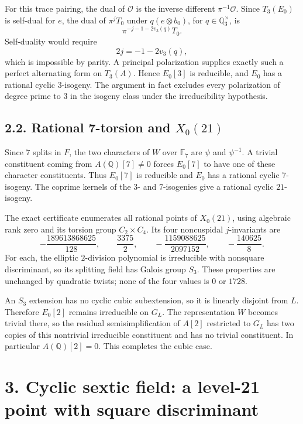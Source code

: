 \documentclass[
  11pt,
]{article}
\newcounter{none} %
\begin{document}
For this trace pairing, the dual of \(\mathcal O\) is the inverse
different \(\pi^{-1}\mathcal O\). Since \(T_3(E_0)\) is self-dual for
\(e\), the dual of \(\pi^jT_0\) under \(q(e\otimes b_0)\), for
\(q\in\mathbb Q_3^\times\), is \[
\pi^{-j-1-2v_3(q)}T_0.
\] Self-duality would require \[
2j=-1-2v_3(q),
\] which is impossible by parity. A principal polarization supplies
exactly such a perfect alternating form on \(T_3(A)\). Hence \(E_0[3]\)
is reducible, and \(E_0\) has a rational cyclic \(3\)-isogeny. The
argument in fact excludes every polarization of degree prime to \(3\) in
the isogeny class under the irreducibility hypothesis.

\subsection{\texorpdfstring{2.2. Rational 7-torsion and
\(X_0(21)\)}{2.2. Rational 7-torsion and X\_0(21)}}\label{rational-7-torsion-and-x_021}

Since \(7\) splits in \(F\), the two characters of \(W\) over
\(\mathbb F_7\) are \(\psi\) and \(\psi^{-1}\). A trivial constituent
coming from \(A(\mathbb Q)[7]\ne0\) forces \(E_0[7]\) to have one of
these character constituents. Thus \(E_0[7]\) is reducible and \(E_0\)
has a rational cyclic \(7\)-isogeny. The coprime kernels of the \(3\)-
and \(7\)-isogenies give a rational cyclic \(21\)-isogeny.

The exact certificate enumerates all rational points of \(X_0(21)\),
using algebraic rank zero and its torsion group \(C_2\times C_4\). Its
four noncuspidal \(j\)-invariants are \[
-\frac{189613868625}{128},\qquad \frac{3375}{2},\qquad
-\frac{1159088625}{2097152},\qquad -\frac{140625}{8}.
\] For each, the elliptic \(2\)-division polynomial is irreducible with
nonsquare discriminant, so its splitting field has Galois group \(S_3\).
These properties are unchanged by quadratic twists; none of the four
values is \(0\) or \(1728\).

An \(S_3\) extension has no cyclic cubic subextension, so it is linearly
disjoint from \(L\). Therefore \(E_0[2]\) remains irreducible on
\(G_L\). The representation \(W\) becomes trivial there, so the residual
semisimplification of \(A[2]\) restricted to \(G_L\) has two copies of
this nontrivial irreducible constituent and has no trivial constituent.
In particular \(A(\mathbb Q)[2]=0\). This completes the cubic case.

\section{3. Cyclic sextic field: a level-21 point with square
discriminant}\label{cyclic-sextic-field-a-level-21-point-with-square-discriminant}
\end{document}
